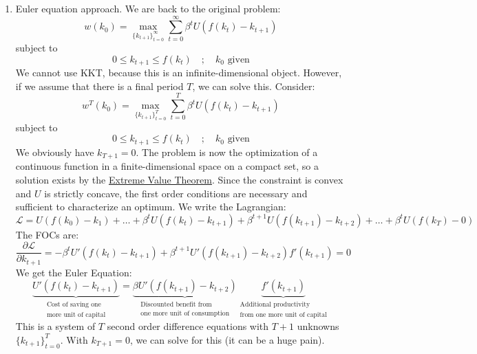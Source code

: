 \documentclass[10pt]{article}
\begin{document}
\begin{example}
\begin{enumerate}
		\item Euler equation approach. We are back to the original problem:
		\[
		w(k_0) = \max_{\{k_{t+1}\}_{t=0}^\infty} \sum_{t=0}^\infty \beta^t U(f(k_t) - k_{t+1})
		\]
		subject to
		\[
		0 \le k_{t+1} \le f(k_t) \quad ; \quad k_0 \text{ given}
		\]
		We cannot use KKT, because this is an infinite-dimensional object. However, if we assume that there is a final period $T$, we can solve this. Consider:
		\[
		w^T(k_0) = \max_{\{k_{t+1}\}_{t=0}^T} \sum_{t=0}^T \beta^t U(f(k_t) - k_{t+1})
		\]
		subject to
		\[
		0 \le k_{t+1} \le f(k_t) \quad ; \quad k_0 \text{ given}
		\]
		We obviously have $k_{T+1} = 0$. The problem is now the optimization of a continuous function in a finite-dimensional space on a compact set, so a solution exists by the \href{https://en.wikipedia.org/wiki/Extreme_value_theorem}{Extreme Value Theorem}. Since the constraint is convex and $U$ is strictly concave, the first order conditions are necessary and sufficient to characterize an optimum. We write the Lagrangian:
		\[
		\mathcal{L} = U(f(k_0) - k_1) + \dots + \beta^t U(f(k_t)-k_{t+1}) + \beta^{t+1} U(f(k_{t+1}) - k_{t+2}) + \dots + \beta^t U(f(k_T) - 0)
		\]
		The FOCs are:
		\[
		\frac{\partial \mathcal{L}}{\partial k_{t+1}} = -\beta^t U'(f(k_t)-k_{t+1})  + \beta^{t+1} U'(f(k_{t+1}) - k_{t+2}) f'(k_{t+1}) = 0
		\]
		We get the Euler Equation:
		\[
		\underbrace{U'(f(k_t) - k_{t+1})}_{\substack{\text{Cost of saving one} \\ \text{more unit of capital}}} = \underbrace{\beta U'(f(k_{t+1}) - k_{t+2})}_{\substack{\text{Discounted benefit from} \\ \text{one more unit of consumption}}}  \underbrace{f'(k_{t+1})}_{\substack{\text{Additional productivity} \\ \text{from one more unit of capital}}}
		\]
		This is a system of $T$ second order difference equations with $T+1$ unknowns $\{k_{t+1}\}_{t=0}^T$. With $k_{T+1} = 0$, we can solve for this (it can be a huge pain).
		

\end{enumerate}
\end{example}
\end{document}
